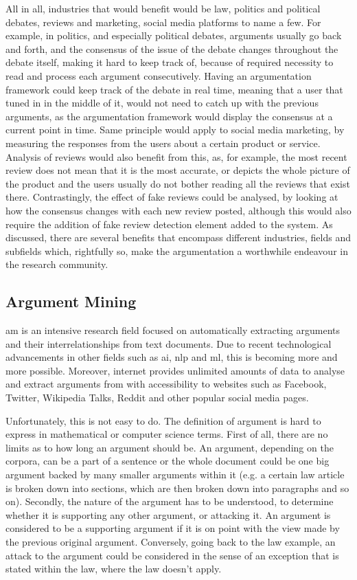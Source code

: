         All in all, industries that would benefit would be law, politics and political debates, reviews and marketing, social media platforms to name a few. For example, in politics, and especially political debates, arguments usually go back and forth, and the consensus of the issue of the debate changes throughout the debate itself, making it hard to keep track of, because of required necessity to read and process each argument consecutively. Having an argumentation framework could keep track of the debate in real time, meaning that a user that tuned in in the middle of it, would not need to catch up with the previous arguments, as the argumentation framework would display the consensus at a current point in time. Same principle would apply to social media marketing, by measuring the responses from the users about a certain product or service. Analysis of reviews would also benefit from this, as, for example, the most recent review does not mean that it is the most accurate, or depicts the whole picture of the product and the users usually do not bother reading all the reviews that exist there. Contrastingly, the effect of fake reviews could be analysed, by looking at how the consensus changes with each new review posted, although this would also require the addition of fake review detection element added to the system. As discussed, there are several benefits that encompass different industries, fields and subfields which, rightfully so, make the argumentation a worthwhile endeavour in the research community.
     
    \subsection{Argument Mining} \label{argumentmining}
        \gls{am} is an intensive research field focused on automatically extracting arguments and their interrelationships from text documents. Due to recent technological advancements in other fields such as \gls{ai}, \gls{nlp} and \gls{ml}, this is becoming more and more possible. Moreover, internet provides unlimited amounts of data to analyse and extract arguments from with accessibility to websites such as Facebook, Twitter, Wikipedia Talks, Reddit and other popular social media pages.
         
        Unfortunately, this is not easy to do. The definition of argument is hard to express in mathematical or computer science terms. First of all, there are no limits as to how long an argument should be. An argument, depending on the corpora, can be a part of a sentence or the whole document could be one big argument backed by many smaller arguments within it (e.g. a certain law article is broken down into sections, which are then broken down into paragraphs and so on). Secondly, the nature of the argument has to be understood, to determine whether it is supporting any other argument, or attacking it. An argument is considered to be a supporting argument if it is on point with the view made by the previous original argument. Conversely, going back to the law example, an attack to the argument could be considered in the sense of an exception that is stated within the law, where the law doesn't apply. 
         
